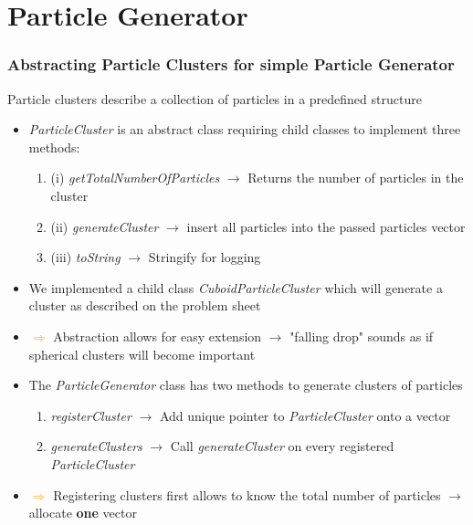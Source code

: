 \section{Particle Generator}

\begin{frame}
    \frametitle{Abstracting Particle Clusters for simple Particle Generator}
    
    Particle clusters describe a collection of particles in a predefined structure

    \begin{itemize}
        \item \emph{ParticleCluster} is an abstract class requiring child classes to implement three methods:
        \begin{enumerate}
            \item (i) \emph{getTotalNumberOfParticles} $\rightarrow$ Returns the number of particles in the cluster
            \item (ii) \emph{generateCluster} $\rightarrow$ insert all particles into the passed particles vector
            \item (iii) \emph{toString} $\rightarrow$ Stringify for logging
        \end{enumerate}  
        \item We implemented a child class \emph{CuboidParticleCluster} which will generate a cluster as described on the problem sheet
        \item[] \!\!\!\!\!\!\!\!\! \textcolor{orange}{$\Rightarrow$} Abstraction allows for easy extension $\rightarrow$ "falling drop" sounds as if spherical clusters will become important
    \end{itemize}

    \begin{itemize}
        \item The \emph{ParticleGenerator} class has two methods to generate clusters of particles
        \begin{enumerate}
            \item \emph{registerCluster} $\rightarrow$ Add unique pointer to \emph{ParticleCluster} onto a vector 
            \item \emph{generateClusters} $\rightarrow$ Call \emph{generateCluster} on every registered \emph{ParticleCluster}
        \end{enumerate}
        \item[] \!\!\!\!\!\!\!\!\! \textcolor{orange}{$\Rightarrow$} Registering clusters first allows to know the total number of particles $\rightarrow$ allocate \textbf{one} vector 
    \end{itemize}

\end{frame}